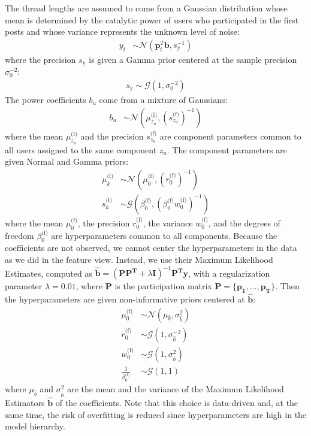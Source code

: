 \documentclass[smallextended]{svjour3}          %
\newcommand{\muo}{\mu_{0}^\text{(f)}}
\newcommand{\ro}{r_{0}^\text{(f)}}
\newcommand{\invro}{\left(r_{0}^\text{(f)}\right)^{-1}}
\newcommand{\wo}{w_{0}^\text{(f)}}
\newcommand{\betaof}{\beta_{0}^\text{(f)}}
\newcommand{\muk}{\mu_{k}^\text{(f)}}
\newcommand{\sk}{s_{k}^\text{(f)}}
\newcommand{\szu}{s_{z_u}^\text{(f)}}
\newcommand{\invszu}{\left(s_{z_u}^{\text{(f)}}\right)^{-1}}
\newcommand{\muzu}{\mu_{z_u}^\text{(f)}}
\begin{document}
The thread lengths are assumed to come from a Gaussian distribution whose mean is determined by the catalytic power of users who participated in the first posts and whose variance represents the unknown level of noise:
\begin{align}
y_t &\sim \mathcal{N}(\mathbf{p}_t^T \mathbf{b}, s_{\text{y}}^{-1})
\end{align}
where the precision $s_{\text{y}}$ is given a Gamma prior centered at the sample precision $\sigma_0^{-2}$:
\begin{align}
s_{\text{y}} \sim \mathcal{G}(1,\sigma_{\text{0}}^{-2})
\end{align}
The power coefficients $b_u$ come from a mixture of Gaussians:
\begin{align}
b_u &\sim \mathcal{N}\left(\muzu, \invszu\right)
\end{align}
where the mean $\muzu$ and the precision $\szu$ are component parameters common to all users assigned to the same component $z_u$. The component parameters are given Normal and Gamma priors:
\begin{align}
\muk &\sim  \mathcal{N}\left(\muo, \invro \right)\\
\sk &\sim  \mathcal{G}\left( \betaof, \left(\betaof\wo\right)^{-1}\right) 
\end{align}
where the mean $\muo$, the precision $\ro$, the variance $\wo$, and the degrees of freedom $\betaof$ are hyperparameters common to all components. Because the coefficients are not observed, we cannot center the hyperparameters in the data as we did in the feature view. Instead, we use their Maximum Likelihood Estimates, computed as $\mathbf{\mathbf{\hat{b}}} = (\mathbf{P}\mathbf{P^T} + \lambda\mathbf{I})^{-1} \mathbf{P^T y}$, with a regularization parameter $\lambda=0.01$, where $\mathbf{P}$ is the participation matrix $\mathbf{P} = \{\mathbf{p_1},...,\mathbf{p_T}\}$. Then the hyperparameters are given non-informative priors centered at $\mathbf{\hat{b}}$:
\begin{align}
\muo &\sim \mathcal{N}(\mu_{\hat{b}}, \sigma_{\hat{b}}^2) \\
\ro &\sim \mathcal{G}(1, \sigma_{\hat{b}}^{-2})\\
\wo  &\sim \mathcal{G}(1, \sigma_{\hat{b}}^{2})\\
\frac{1}{\betaof}&\sim \mathcal{G}(1, 1)
\end{align}
where $\mu_{\hat{b}}$ and $\sigma_{\hat{b}}^2$ are the mean and the variance of the Maximum Likelihood Estimators $\mathbf{\hat{b}}$ of the coefficients. Note that this choice is data-driven and, at the same time, the risk of overfitting is reduced since hyperparameters are high in the model hierarchy.
\end{document}
